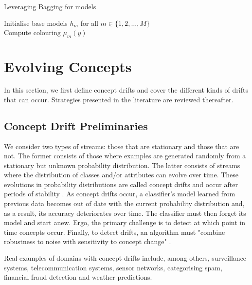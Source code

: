 \begin{algorithm}
\caption{Leveraging Bagging for  models\label{alg:leveraging-bagging} \cite{bifet2010leveraging}}
Initialise base models $h_{m}$ for all $m \in \{1,2, \ldots, M\}$\\
Compute colouring $\mu_m(y)$\\
\end{algorithm}


\section{Evolving Concepts\label{section:concept_drift}}
In this section, we first define concept drifts and cover the different kinds of drifts that can occur. Strategies presented in the literature are reviewed thereafter.

\subsection{Concept Drift Preliminaries}

We consider two types of streams: those that are stationary and those that are not. The former consists of those where examples are generated randomly from a stationary but unknown probability distribution. The latter consists of streams where the distribution of classes and/or attributes can evolve over time. These evolutions in probability distributions are called concept drifts and occur after periods of stability \cite{gama2010knowledge, KRAWCZYK2017132}. As concept drifts occur, a classifier's model learned from previous data becomes out of date with the current probability distribution and, as a result, its accuracy deteriorates over time. The classifier must then forget its model and start anew.
Ergo, the primary challenge is to detect at which point in time concepts occur. Finally, to detect drifts, an algorithm must "combine robustness to noise with sensitivity to concept change" \cite{gama2010knowledge}.

Real examples of domains with concept drifts include, among others, surveillance systems, telecommunication systems, sensor networks, categorising spam, financial fraud detection and weather predictions. 

